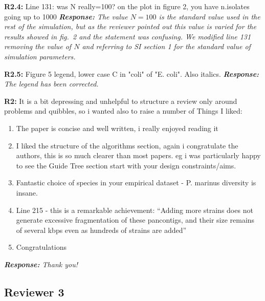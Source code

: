 \documentclass[aps,rmp,onecolumn]{revtex4-1}
\newcommand{\Marco}[1]{{\color{gray}Marco: #1}}
\newcommand{\reviewer}[2]{\textbf{#1:} #2\vskip 5mm}
\newcommand{\response}[1]{{\it {\color{response}\textbf{Response:} #1}}\vskip 5mm}
\begin{document}
\reviewer{R2.4}{Line 131: was N really=100? on the plot in figure 2, you have n.isolates going up to 1000}
\response{The value $N=100$ is the standard value used in the rest of the simulation, but as the reviewer pointed out this value is varied for the results showed in fig.~2 and the statement was confusing. We modified line 131 removing the value of $N$ and referring to SI section 1 for the standard value of simulation parameters.}

\reviewer{R2.5}{Figure 5 legend, lower case C in "coli" of "E. coli". Also italics.}
\response{The legend has been corrected.}


\reviewer{R2}{It is a bit depressing and unhelpful to structure a review only around problems and quibbles, so i wanted also to raise a number of
      Things I liked:

      \begin{enumerate}
            \item The paper is concise and well written, i really enjoyed reading it
            \item I liked the structure of the algorithms section, again i congratulate the authors, this is so much clearer than most papers. eg i was particularly happy to see the Guide Tree section start with your design constraints/aims.
            \item Fantastic choice of species in your empirical dataset - P. marinus diversity is insane.
            \item Line 215 - this is a remarkable achievement: ``Adding more strains does not generate excessive fragmentation of these pancontigs, and their size remains of several kbps even as hundreds of strains are added''
            \item Congratulations
      \end{enumerate}
}
\response{Thank you!}

\subsection*{Reviewer 3}
\end{document}
